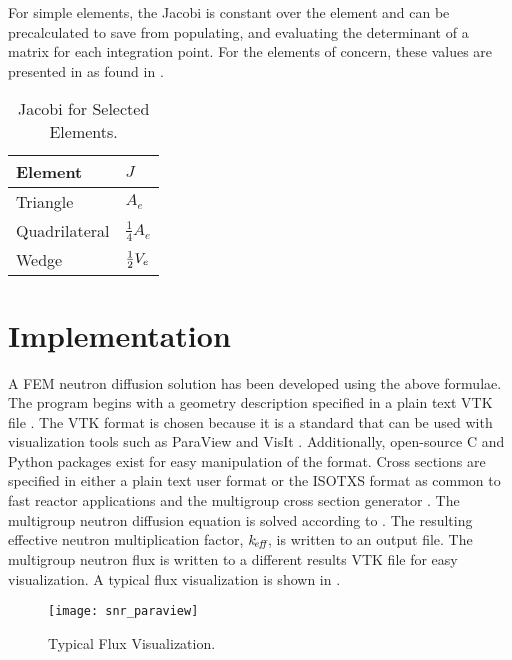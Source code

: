    For simple elements, the Jacobi is constant over the element and can be
    precalculated to save from populating, and evaluating the 
    determinant of a matrix for each integration point. For the elements of 
    concern, these values are presented in  as found in 
    \cite{textbookcolorado}.
    \begin{table}
      \caption{Jacobi for Selected Elements.}
      \label{tab:jacobi}
      \begin{center}
        \begin{tabular}{ll}
          \toprule
          Element & $J$ \\
          \midrule
          Triangle      & $A_e$ \\
          Quadrilateral & $\frac{1}{4} A_e$ \\
          Wedge         & $\frac{1}{2} V_e$ \\
          \bottomrule
        \end{tabular}
      \end{center}
    \end{table}
\section{Implementation}
  A FEM neutron diffusion solution has been developed using 
  the above formulae. The program begins with a geometry description specified
  in a plain text VTK file \cite{vtk}. The VTK format is chosen because it is a
  standard that can be used with visualization tools such as ParaView
  \cite{ParaView} and VisIt \cite{VisIt}. Additionally, open-source C and Python
  packages exist for easy manipulation of the format. Cross sections are 
  specified in either a plain text user format or the ISOTXS format as common to 
  fast reactor applications and the multigroup cross section generator \mcc 
  \cite{mcc}. The multigroup neutron diffusion equation is solved according to 
  . The resulting effective neutron multiplication 
  factor, $k_{\!\mbox{\scriptsize \em eff}}$, is written to an output file. The multigroup neutron flux is
  written to a different results VTK file for easy visualization. A typical flux 
  visualization is shown in .

  \begin{figure}
    \centering
    \texttt{[image: snr\_paraview]}
    \caption{Typical Flux Visualization.}
    \label{fig:snr_paraview}
  \end{figure}

